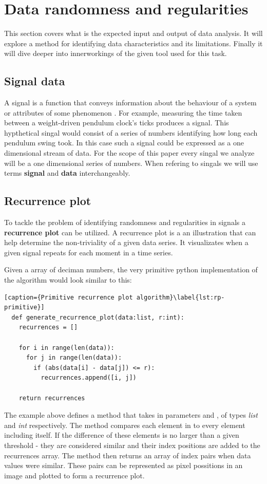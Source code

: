 \documentclass[a4paper,12pt,fleqn]{article}
\begin{document}
\section{Data randomness and regularities}
This section covers what is the expected input and output of data analysis.
It will explore a method for identifying data characteristics and its limitations.
Finally it will dive deeper into innerworkings of the given tool used for this task.


\subsection{Signal data}
A signal is a function that conveys information about the behaviour of a system or attributes of some phenomenon \cite{priemer1990introductory}.
For example, measuring the time taken between a weight-driven
pendulum clock's ticks produces a signal.
This hypthetical singal would consist of a series of numbers identifying how long each pendulum swing took.
In this case such a signal could be expressed as a one dimensional stream of data.
For the scope of this paper every singal we analyze will be a one dimensional series of numbers.
When refering to singals we will use terms \textbf{signal} and \textbf{data} interchangeably.

\subsection{Recurrence plot}
To tackle the problem of identifying randomness and regularities in signals a \textbf{recurrence plot} can be utilized.
A recurrence plot is a an illustration that can help determine the non-triviality of a given data series.
It visualizates when a given signal repeats for each moment in a time series.

Given a  array of deciman numbers, the very primitive python implementation of the algorithm would look similar to this:
\begin{lstlisting}[caption={Primitive recurrence plot algorithm}\label{lst:rp-primitive}]
  def generate_recurrence_plot(data:list, r:int):
    recurrences = []
    
    for i in range(len(data)):
      for j in range(len(data)):
        if (abs(data[i] - data[j]) <= r):
          recurrences.append([i, j])

    return recurrences
\end{lstlisting}
The example above defines a method  that takes in parameters  and , of types \emph{list} and \emph{int} respectively.
The method compares each element in  to every element including itself.
If the difference of these elements is no larger than a given threshold  - they are considered similar and their index positions are added to the recurrences array.
The method then returns an array of index pairs when data values were similar.
These pairs can be represented as pixel possitions in an image and plotted to form a recurrence plot.
\end{document}
